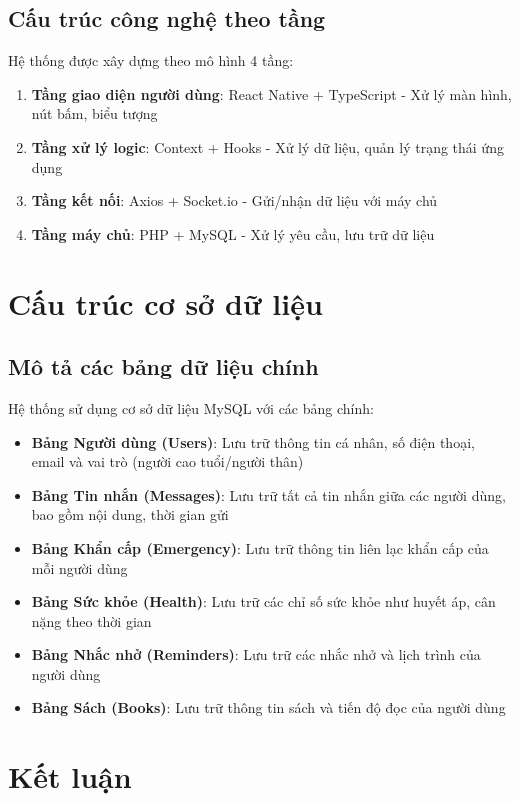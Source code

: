 \documentclass[12pt,a4paper]{article}
\begin{document}
\subsection{Cấu trúc công nghệ theo tầng}
Hệ thống được xây dựng theo mô hình 4 tầng:

\begin{enumerate}[leftmargin=2cm]
    \item \textbf{Tầng giao diện người dùng}: React Native + TypeScript - Xử lý màn hình, nút bấm, biểu tượng
    \item \textbf{Tầng xử lý logic}: Context + Hooks - Xử lý dữ liệu, quản lý trạng thái ứng dụng
    \item \textbf{Tầng kết nối}: Axios + Socket.io - Gửi/nhận dữ liệu với máy chủ
    \item \textbf{Tầng máy chủ}: PHP + MySQL - Xử lý yêu cầu, lưu trữ dữ liệu
\end{enumerate}

\section{Cấu trúc cơ sở dữ liệu}

\subsection{Mô tả các bảng dữ liệu chính}
Hệ thống sử dụng cơ sở dữ liệu MySQL với các bảng chính:

\begin{itemize}[leftmargin=2cm]
    \item \textbf{Bảng Người dùng (Users)}: Lưu trữ thông tin cá nhân, số điện thoại, email và vai trò (người cao tuổi/người thân)
    \item \textbf{Bảng Tin nhắn (Messages)}: Lưu trữ tất cả tin nhắn giữa các người dùng, bao gồm nội dung, thời gian gửi
    \item \textbf{Bảng Khẩn cấp (Emergency)}: Lưu trữ thông tin liên lạc khẩn cấp của mỗi người dùng
    \item \textbf{Bảng Sức khỏe (Health)}: Lưu trữ các chỉ số sức khỏe như huyết áp, cân nặng theo thời gian
    \item \textbf{Bảng Nhắc nhở (Reminders)}: Lưu trữ các nhắc nhở và lịch trình của người dùng
    \item \textbf{Bảng Sách (Books)}: Lưu trữ thông tin sách và tiến độ đọc của người dùng
\end{itemize}

\section{Kết luận}
\end{document}
